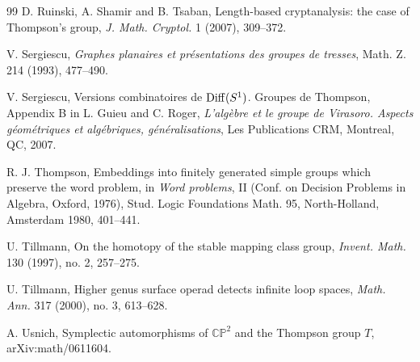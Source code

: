 \documentclass[twoside]{irmaems}
\theoremstyle{plain}
\theoremstyle{definition}
\theoremstyle{remark}
\begin{document}
\begin{small}
\begin{thebibliography}{99}
D. Ruinski, A. Shamir and B. Tsaban, Length-based cryptanalysis: the case of
Thompson's group, {\em J. Math. Cryptol.} 1 (2007), 309--372. 


V. Sergiescu, {\em Graphes planaires et pr\'esentations des groupes de 
tresses}, Math. Z. 214 (1993), 477--490.

V. Sergiescu, { Versions combinatoires de ${\rm Diff}(S^1)$. 
Groupes de Thompson}, Appendix B in 
L. Guieu and C. Roger, {\em L'alg\`ebre et le groupe de Virasoro. 
Aspects g\'eom\'etriques et alg\'ebriques, g\'en\'eralisations}, 
Les Publications CRM, Montreal, QC, 2007.


R. J. Thompson, Embeddings into finitely generated simple groups 
which preserve the word problem, in {\em Word problems}, II 
(Conf. on Decision Problems in Algebra, Oxford, 1976), 
Stud. Logic Foundations Math. 95, North-Holland, Amsterdam 1980, 
401--441.

U. Tillmann, { On the homotopy of the stable mapping class group}, 
{\em   Invent. Math.}  130  (1997),  no. 2, 257--275. 
  
U. Tillmann, { Higher genus surface operad detects infinite loop spaces}, 
{\em    Math. Ann.}  317  (2000),  no. 3, 613--628.


A. Usnich, Symplectic automorphisms of $\mathbb C\mathbb P^2$ and 
the Thompson group $T$, arXiv:math/0611604.  



\end{thebibliography}

\end{small}
\end{document}
